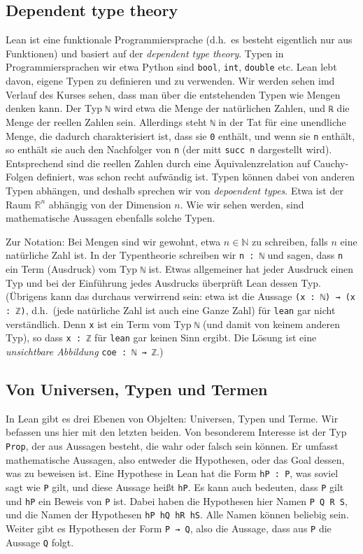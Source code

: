 \documentclass[11pt]{article}
\newcommand{\leanstate}{\texttt}
\begin{document}
\subsection{Dependent type theory}
Lean ist eine funktionale Programmiersprache (d.h.\ es besteht eigentlich nur aus Funktionen) und basiert auf der {\em dependent type theory}. Typen in Programmiersprachen wir etwa Python sind {\tt bool}, {\tt int}, {\tt double} etc. Lean lebt davon, eigene Typen zu definieren und zu verwenden. Wir werden sehen imd Verlauf des Kurses sehen, dass man über die entstehenden Typen wie Mengen denken kann. Der Typ \leanstate{ℕ} wird etwa die Menge der natürlichen Zahlen, und \leanstate{ℝ} die Menge der reellen Zahlen sein. Allerdings steht \leanstate{ℕ} in der Tat für eine unendliche Menge, die dadurch charakterisiert ist, dass sie \leanstate{0} enthält, und wenn sie \leanstate{n} enthält, so enthält sie auch den Nachfolger von \leanstate{n} (der mitt \leanstate{succ n} dargestellt wird). Entsprechend sind die reellen Zahlen durch eine Äquivalenzrelation auf Cauchy-Folgen definiert, was schon recht aufwändig ist. Typen können dabei von anderen Typen abhängen, und deshalb sprechen wir von {\em depoendent types}. Etwa ist der Raum $\mathbb R^n$ abhängig von der Dimension $n$. Wie wir sehen werden, sind mathematische Aussagen ebenfalls solche Typen.

Zur Notation: Bei Mengen sind wir gewohnt, etwa $n\in\mathbb N$ zu schreiben, falls $n$ eine natürliche Zahl ist. In der Typentheorie schreiben wir \leanstate{n : ℕ} und sagen, dass \leanstate{n} ein Term (Ausdruck) vom Typ \leanstate{ℕ} ist. Etwas allgemeiner hat jeder Ausdruck einen Typ und bei der Einführung jedes Ausdrucks überprüft Lean dessen Typ. (Übrigens kann das durchaus verwirrend sein: etwa ist die Aussage \leanstate{(x : ℕ) → (x : ℤ)}, d.h.\ (jede natürliche Zahl ist auch eine Ganze Zahl) für \leanstate{lean} gar nicht verständlich. Denn \leanstate{x} ist ein Term vom Typ \leanstate{ℕ} (und damit von keinem anderen Typ), so dass \leanstate{x : ℤ} für \leanstate{lean} gar keinen Sinn ergibt. Die Lösung ist eine {\em unsichtbare Abbildung} \leanstate{coe : ℕ → ℤ}.)

\subsection{Von Universen, Typen und Termen}
In Lean gibt es drei Ebenen von Objelten: Universen, Typen und Terme. Wir befassen uns hier mit den letzten beiden. Von besonderem Interesse ist der Typ {\tt Prop}, der aus Aussagen besteht, die wahr oder falsch sein können. Er umfasst mathematische Aussagen, also entweder die Hypothesen, oder das Goal dessen, was zu beweisen ist.  Eine Hypothese in Lean hat die Form \leanstate{hP : P}, was soviel sagt wie \leanstate{P} gilt, und diese Aussage heißt \leanstate{hP}. Es kann auch bedeuten, dass \leanstate{P} gilt und \leanstate{hP} ein Beweis von \leanstate{P} ist. Dabei haben die Hypothesen hier Namen \leanstate{P Q R S}, und die Namen der Hypothesen \leanstate{hP hQ hR hS}. Alle Namen können beliebig sein. Weiter gibt es Hypothesen der Form \leanstate{P → Q}, also die Aussage, dass aus \leanstate{P} die Aussage \leanstate{Q} folgt. 
\end{document}
